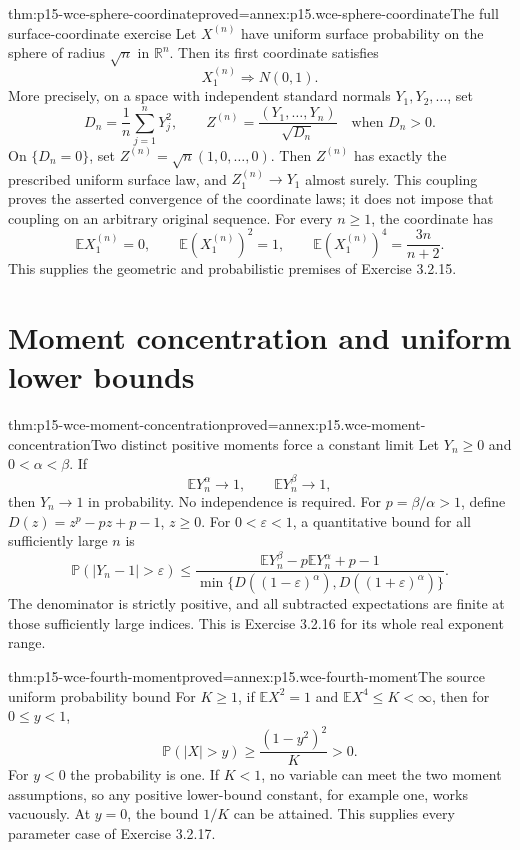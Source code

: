 \begin{hbtheorem}{thm:p15-wce-sphere-coordinate}{proved=annex:p15.wce-sphere-coordinate}{The full surface-coordinate exercise}
Let \(X^{(n)}\) have uniform surface probability on the
sphere of radius \(\sqrt n\) in \(\mathbb R^n\).
Then its first coordinate satisfies
\[
                         X^{(n)}_1\Rightarrow N(0,1).
 \]
More precisely, on a space with independent standard normals
\(Y_1,Y_2,\ldots\), set
\[
 D_n=\frac1n\sum_{j=1}^nY_j^2,\qquad
 Z^{(n)}=\frac{(Y_1,\ldots,Y_n)}{\sqrt{D_n}}
                                      \quad\text{when }D_n>0.
 \]
On \(\{D_n=0\}\), set \(Z^{(n)}=\sqrt n(1,0,\ldots,0)\).
Then \(Z^{(n)}\) has exactly the prescribed uniform surface law,
and \(Z^{(n)}_1\to Y_1\) almost surely.
This coupling proves the asserted convergence of the coordinate laws;
it does not impose that coupling on an arbitrary original sequence.
For every \(n\geq1\), the coordinate has
\[
 \mathbb EX^{(n)}_1=0,\qquad
 \mathbb E(X^{(n)}_1)^2=1,\qquad
 \mathbb E(X^{(n)}_1)^4=\frac{3n}{n+2}.
 \]
This supplies the geometric and probabilistic premises of Exercise 3.2.15.
\end{hbtheorem}

\section{Moment concentration and uniform lower bounds}
\label{sec:p15-wce-moments}

\begin{hbtheorem}{thm:p15-wce-moment-concentration}{proved=annex:p15.wce-moment-concentration}{Two distinct positive moments force a constant limit}
Let \(Y_n\geq0\) and \(0<\alpha<\beta\).
If
\[
                       \mathbb EY_n^\alpha\to1,\qquad
                       \mathbb EY_n^\beta\to1,
 \]
then \(Y_n\to1\) in probability. No independence is required.
For \(p=\beta/\alpha>1\), define
\(D(z)=z^p-pz+p-1\), \(z\geq0\).
For \(0<\varepsilon<1\), a quantitative bound for all
sufficiently large \(n\) is
\[
 \mathbb P(|Y_n-1|>\varepsilon)
 \leq
 \frac{\mathbb EY_n^\beta-p\mathbb EY_n^\alpha+p-1}
 {\min\{D((1-\varepsilon)^\alpha),D((1+\varepsilon)^\alpha)\}}.
 \]
The denominator is strictly positive, and all subtracted
expectations are finite at those sufficiently large indices.
This is Exercise 3.2.16 for its whole real exponent range.
\end{hbtheorem}

\begin{hbtheorem}{thm:p15-wce-fourth-moment}{proved=annex:p15.wce-fourth-moment}{The source uniform probability bound}
For \(K\geq1\), if \(\mathbb EX^2=1\) and
\(\mathbb EX^4\leq K<\infty\), then for \(0\leq y<1\),
\[
                 \mathbb P(|X|>y)\geq\frac{(1-y^2)^2}{K}>0.
 \]
For \(y<0\) the probability is one.
If \(K<1\), no variable can meet the two moment assumptions,
so any positive lower-bound constant, for example one, works vacuously.
At \(y=0\), the bound \(1/K\) can be attained.
This supplies every parameter case of Exercise 3.2.17.
\end{hbtheorem}

